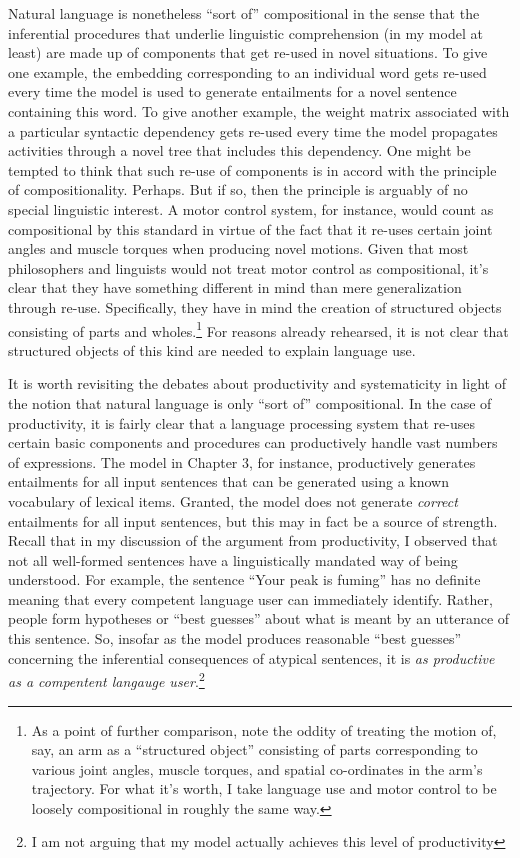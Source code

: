Natural language is nonetheless ``sort of'' compositional in the sense that the inferential procedures that underlie linguistic comprehension (in my model at least) are made up of components that get re-used in novel situations. To give one example, the embedding corresponding to an individual word gets re-used every time the model is used to generate entailments for a novel sentence containing this word. To give another example, the weight matrix associated with a particular syntactic dependency gets re-used every time the model propagates activities through a novel tree that includes this dependency. One might be tempted to think that such re-use of components is in accord with the principle of compositionality. Perhaps. But if so, then the principle is arguably of no special linguistic interest. A motor control system, for instance, would count as compositional by this standard in virtue of the fact that it re-uses certain joint angles and muscle torques when producing novel motions. Given that most philosophers and linguists would not treat motor control as compositional, it's clear that they have something different in mind than mere generalization through re-use. Specifically, they have in mind the creation of structured objects consisting of parts and wholes.\footnote{As a point of further comparison, note the oddity of treating the motion of, say, an arm as a ``structured object'' consisting of parts corresponding to various joint angles, muscle torques, and spatial co-ordinates in the arm's trajectory. For what it's worth, I take language use and motor control to be loosely compositional in roughly the same way.} For reasons already rehearsed, it is not clear that structured objects of this kind are needed to explain language use.

It is worth revisiting the debates about productivity and systematicity in light of the notion that natural language is only ``sort of'' compositional. In the case of productivity, it is fairly clear that a language processing system that re-uses certain basic components and procedures can productively handle vast numbers of expressions. The model in Chapter 3, for instance, productively generates entailments for all input sentences that can be generated using a known vocabulary of lexical items. Granted, the model does not generate \textit{correct} entailments for all input sentences, but this may in fact be a source of strength. Recall that in my discussion of the argument from productivity, I observed that not all well-formed sentences have a linguistically mandated way of being understood. For example, the sentence ``Your peak is fuming'' has no definite meaning that every competent language user can immediately identify. Rather, people form hypotheses or ``best guesses'' about what is meant by an utterance of this sentence. So, insofar as the model produces reasonable ``best guesses'' concerning the inferential consequences of atypical sentences, it is \textit{as productive as a compentent langauge user}.\footnote{I am not arguing that my model actually achieves this level of productivity}

